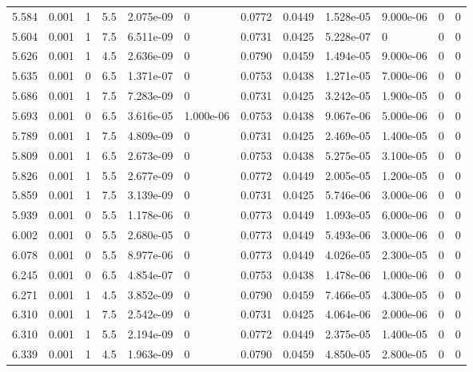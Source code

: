 \documentclass[preview]{standalone}
\begin{document}
{{{\begin{tabular}{L{1.2cm}C{1.2cm} C{0.3cm}C{0.5cm} C{1.4cm}C{1.4cm} C{1.4cm}C{1.4cm} C{1.6cm}C{1.6cm} C{1.6cm}C{1.6cm}}
  5.584  &  0.001  & 1     & 5.5 &  2.075e-09  & 0  &  0.0772&   0.0449& 1.528e-05 & 9.000e-06   &  0 & 0  \\ 
  5.604  &  0.001  & 1     & 7.5 &  6.511e-09  & 0  &  0.0731&   0.0425& 5.228e-07 & 0   &  0 & 0  \\ 
  5.626  &  0.001  & 1     & 4.5 &  2.636e-09  & 0  &  0.0790&   0.0459& 1.494e-05 & 9.000e-06   &  0 & 0  \\ 
  5.635  &  0.001  & 0     & 6.5 &  1.371e-07  & 0  &  0.0753&   0.0438& 1.271e-05 & 7.000e-06   &  0 & 0  \\ 
  5.686  &  0.001  & 1     & 7.5 &  7.283e-09  & 0  &  0.0731&   0.0425& 3.242e-05 & 1.900e-05   &  0 & 0  \\ 
  5.693  &  0.001  & 0     & 6.5 &  3.616e-05  & 1.000e-06  &  0.0753&   0.0438& 9.067e-06 & 5.000e-06   &  0 & 0  \\ 
  5.789  &  0.001  & 1     & 7.5 &  4.809e-09  & 0  &  0.0731&   0.0425& 2.469e-05 & 1.400e-05   &  0 & 0  \\ 
  5.809  &  0.001  & 1     & 6.5 &  2.673e-09  & 0  &  0.0753&   0.0438& 5.275e-05 & 3.100e-05   &  0 & 0  \\ 
  5.826  &  0.001  & 1     & 5.5 &  2.677e-09  & 0  &  0.0772&   0.0449& 2.005e-05 & 1.200e-05   &  0 & 0  \\ 
  5.859  &  0.001  & 1     & 7.5 &  3.139e-09  & 0  &  0.0731&   0.0425& 5.746e-06 & 3.000e-06   &  0 & 0  \\ 
  5.939  &  0.001  & 0     & 5.5 &  1.178e-06  & 0  &  0.0773&   0.0449& 1.093e-05 & 6.000e-06   &  0 & 0  \\ 
  6.002  &  0.001  & 0     & 5.5 &  2.680e-05  & 0  &  0.0773&   0.0449& 5.493e-06 & 3.000e-06   &  0 & 0  \\ 
  6.078  &  0.001  & 0     & 5.5 &  8.977e-06  & 0  &  0.0773&   0.0449& 4.026e-05 & 2.300e-05   &  0 & 0  \\ 
  6.245  &  0.001  & 0     & 6.5 &  4.854e-07  & 0  &  0.0753&   0.0438& 1.478e-06 & 1.000e-06   &  0 & 0  \\ 
  6.271  &  0.001  & 1     & 4.5 &  3.852e-09  & 0  &  0.0790&   0.0459& 7.466e-05 & 4.300e-05   &  0 & 0  \\ 
  6.310  &  0.001  & 1     & 7.5 &  2.542e-09  & 0  &  0.0731&   0.0425& 4.064e-06 & 2.000e-06   &  0 & 0  \\ 
  6.310  &  0.001  & 1     & 5.5 &  2.194e-09  & 0  &  0.0772&   0.0449& 2.375e-05 & 1.400e-05   &  0 & 0  \\ 
  6.339  &  0.001  & 1     & 4.5 &  1.963e-09  & 0  &  0.0790&   0.0459& 4.850e-05 & 2.800e-05   &  0 & 0  \\ 

\end{tabular}}}}
\end{document}
